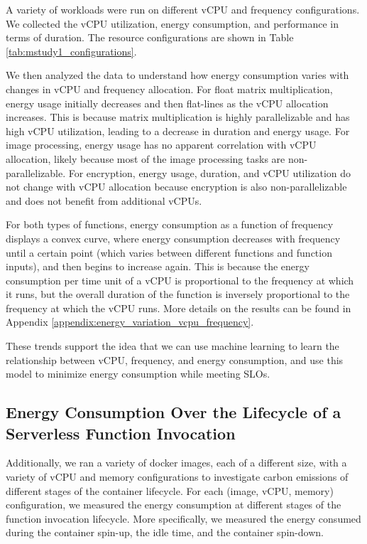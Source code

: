 \documentclass[times, 10pt,twocolumn]{article}
\begin{document}
A variety of workloads were run on different vCPU and frequency configurations. We collected the vCPU utilization, energy consumption, and performance in terms of duration. The resource configurations are shown in Table \ref{tab:mstudy1_configurations}.

We then analyzed the data to understand how energy consumption varies with changes in vCPU and frequency allocation. For float matrix multiplication, energy usage initially decreases and then flat-lines as the vCPU allocation increases. This is because matrix multiplication is highly parallelizable and has high vCPU utilization, leading to a decrease in duration and energy usage. For image processing, energy usage has no apparent correlation with vCPU allocation, likely because most of the image processing tasks are non-parallelizable. For encryption, energy usage, duration, and vCPU utilization do not change with vCPU allocation because encryption is also non-parallelizable and does not benefit from additional vCPUs.

For both types of functions, energy consumption as a function of frequency displays a convex curve, where energy consumption decreases with frequency until a certain point (which varies between different functions and function inputs), and then begins to increase again. This is because the energy consumption per time unit of a vCPU is proportional to the frequency at which it runs, but the overall duration of the function is inversely proportional to the frequency at which the vCPU runs. More details on the results can be found in Appendix \ref{appendix:energy_variation_vcpu_frequency}.

These trends support the idea that we can use machine learning to learn the relationship between vCPU, frequency, and energy consumption, and use this model to minimize energy consumption while meeting SLOs.

\subsection{Energy Consumption Over the Lifecycle of a Serverless Function Invocation}
Additionally, we ran a variety of docker images, each of a different size, with a variety of vCPU and memory configurations to investigate carbon emissions of different stages of the container lifecycle. For each (image, vCPU, memory) configuration, we measured the energy consumption at different stages of the function invocation lifecycle. More specifically, we measured the energy consumed during the container spin-up, the idle time, and the container spin-down.
\end{document}
